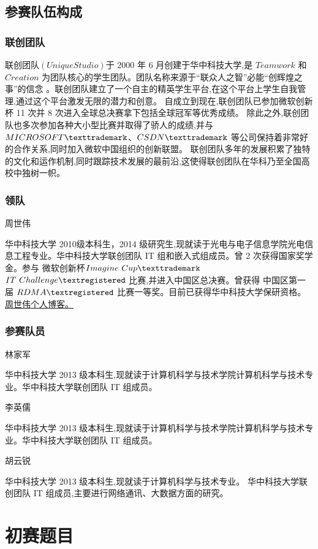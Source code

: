 \documentclass[format=draft,language=chinese,category=SDN]{hustreport}
\begin{document}
\section{参赛队伍构成}
\subsection{联创团队}
联创团队$(Unique Studio)$于 2000 年 6 月创建于华中科技大学,是 $Teamwork$ 和
 $Creation$ 为团队核心的学生团队。团队名称来源于“联众人之智”必能“创辉煌之事”的信念
。联创团队建立了一个自主的精英学生平台,在这个平台上学生自我管理,通过这个平台激发无限的潜力和创意。
自成立到现在,联创团队已参加微软创新杯 11 次并 8 次进入全球总决赛拿下包括全球冠军等优秀成绩。
除此之外,联创团队也多次参加各种大小型比赛并取得了骄人的成绩,并与$MICROSOFT\texttrademark$、$CSDN\texttrademark$ 等公司保持着非常好的合作关系,同时加入微软中国组织的创新联盟。
联创团队多年的发展积累了独特的文化和运作机制,同时跟踪技术发展的最前沿,这使得联创团队在华科乃至全国高校中独树一帜。
\subsection{领队}
周世伟

华中科技大学 2010级本科生，2014 级研究生,现就读于光电与电子信息学院光电信息工程专业。华中科技大学联创团队 IT 组和嵌入式组成员。曾 2 次获得国家奖学金。参与 微软创新杯$Imagine~Cup\texttrademark$ $IT~Challenge\textregistered$ 比赛,并进入中国区总决赛。曾获得
中国区第一届 $RDMA\textregistered$ 比赛一等奖。目前已获得华中科技大学保研资格。
\href{http://zhoushiwei1992.blog.163.com}{周世伟个人博客。}
\subsection{参赛队员}
林家军

华中科技大学 2013 级本科生,现就读于计算机科学与技术学院计算机科学与技术专业。华中科技大学联创团队 IT 组成员。

李英儒

华中科技大学 2013 级本科生,现就读于计算机科学与技术学院计算机科学与技术专业。华中科技大学联创团队 IT 组成员。

胡云锐

华中科技大学 2013 级本科生,现就读于计算机科学与技术专业。
华中科技大学联创团队 IT 组成员,主要进行网络通讯、大数据方面的研究。

\chapter{初赛题目}\label{chapter:Questions}
\end{document}
